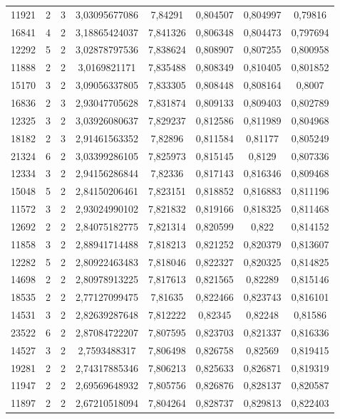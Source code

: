 \begin{longtable}{|c|c|c|c|c|c|c|c|}
11921 & 2 & 3 & 3,03095677086 & 7,84291 & 0,804507 & 0,804997 & 0,79816 \\
16841 & 4 & 2 & 3,18865424037 & 7,841326 & 0,806348 & 0,804473 & 0,797694 \\
12292 & 5 & 2 & 3,02878797536 & 7,838624 & 0,808907 & 0,807255 & 0,800958 \\
11888 & 2 & 2 & 3,0169821171 & 7,835488 & 0,808349 & 0,810405 & 0,801852 \\
15170 & 3 & 2 & 3,09056337805 & 7,833305 & 0,808448 & 0,808164 & 0,8007 \\
16836 & 2 & 3 & 2,93047705628 & 7,831874 & 0,809133 & 0,809403 & 0,802789 \\
12325 & 3 & 2 & 3,03926080637 & 7,829237 & 0,812586 & 0,811989 & 0,804968 \\
18182 & 2 & 3 & 2,91461563352 & 7,82896 & 0,811584 & 0,81177 & 0,805249 \\
21324 & 6 & 2 & 3,03399286105 & 7,825973 & 0,815145 & 0,8129 & 0,807336 \\
12334 & 3 & 2 & 2,94156286844 & 7,82336 & 0,817143 & 0,816346 & 0,809468 \\
15048 & 5 & 2 & 2,84150206461 & 7,823151 & 0,818852 & 0,816883 & 0,811196 \\
11572 & 3 & 2 & 2,93024990102 & 7,821832 & 0,819166 & 0,818325 & 0,811468 \\
12692 & 2 & 2 & 2,84075182775 & 7,821314 & 0,820599 & 0,822 & 0,814152 \\
11858 & 3 & 2 & 2,88941714488 & 7,818213 & 0,821252 & 0,820379 & 0,813607 \\
12282 & 5 & 2 & 2,80922463483 & 7,818046 & 0,822327 & 0,820325 & 0,814825 \\
14698 & 2 & 2 & 2,80978913225 & 7,817613 & 0,821565 & 0,82289 & 0,815146 \\
18535 & 2 & 2 & 2,77127099475 & 7,81635 & 0,822466 & 0,823743 & 0,816101 \\
14531 & 3 & 2 & 2,82639287648 & 7,812222 & 0,82345 & 0,82248 & 0,81586 \\
23522 & 6 & 2 & 2,87084722207 & 7,807595 & 0,823703 & 0,821337 & 0,816336 \\
14527 & 3 & 2 & 2,7593488317 & 7,806498 & 0,826758 & 0,82569 & 0,819415 \\
19281 & 2 & 2 & 2,74317885346 & 7,806213 & 0,825633 & 0,826871 & 0,819319 \\
11947 & 2 & 2 & 2,69569648932 & 7,805756 & 0,826876 & 0,828137 & 0,820587 \\
11897 & 2 & 2 & 2,67210518094 & 7,804264 & 0,828737 & 0,829813 & 0,822403 \\

\end{longtable}
